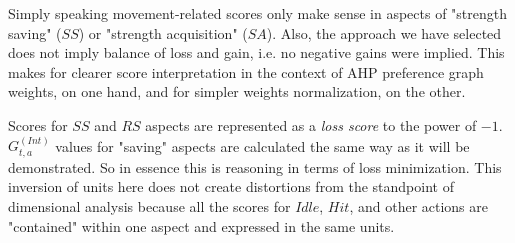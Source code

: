 Simply speaking movement-related scores only make sense in aspects of "strength saving" ($SS$) or "strength acquisition"
($SA$). Also, the approach we have selected does not imply balance of loss and gain, i.e. no negative gains were
implied. This makes for clearer score interpretation in the context of AHP preference graph weights, on one hand, and
for simpler weights normalization, on the other.

Scores for $SS$ and $RS$ aspects are represented as a \textit{loss score} to the power of $-1$. $G_{t,a}^{(Int)}$ values
for "saving" aspects are calculated the same way as it will be demonstrated. So in essence this is reasoning in terms of
loss minimization. This inversion of units here does not create distortions from the standpoint of dimensional analysis
because all the scores for $Idle$, $Hit$, and other actions are "contained" within one aspect and expressed in the same
units.
